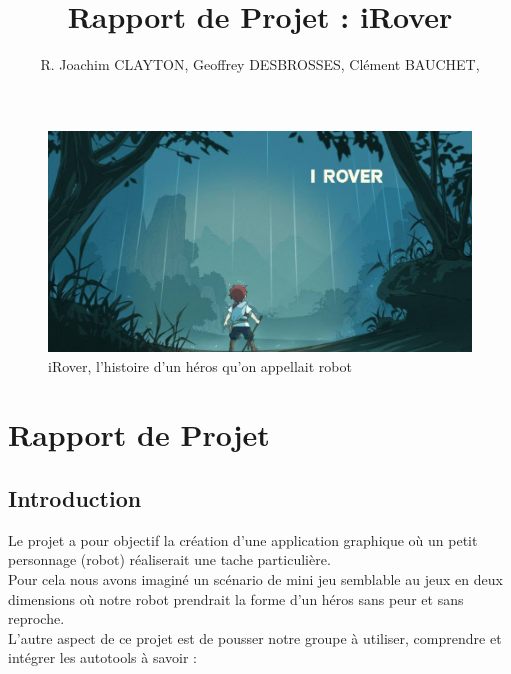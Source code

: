 \documentclass[a4paper 12pts]{article}
\title{Rapport de Projet : iRover}
\author{R. Joachim CLAYTON, Geoffrey DESBROSSES, Clément BAUCHET, }
\begin{document}
\maketitle


\begin{figure}[h]
   \includegraphics[width=350pt]{Illustration/proj_irover.jpg}
	\caption{iRover, l'histoire d'un héros qu'on appellait robot}
\end{figure}



\newpage


\renewcommand{\contentsname}{Sommaire} 
\tableofcontents

\newpage








\section{Rapport de Projet}


\vspace{2cm}



\subsection{Introduction}

Le projet a pour objectif la création d'une application graphique où un petit personnage (robot) réaliserait une tache particulière.\\
Pour cela nous avons imaginé un scénario de mini jeu semblable au jeux en deux dimensions où notre robot prendrait la forme d'un héros sans peur et sans reproche.\\
L'autre aspect de ce projet est de pousser notre groupe à utiliser, comprendre et intégrer les autotools à savoir : 
\end{document}
